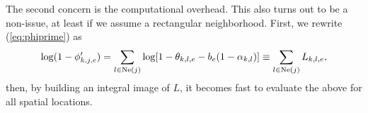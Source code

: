 \documentclass{article}
\begin{document}
The second concern is the computational overhead. This also turns out to be a non-issue, at least if we assume a rectangular neighborhood. First, we rewrite (\ref{eq:phiprime}) as 
\[
    \log(1 - \phi'_{k,j,e}) = \sum_{l \in \text{Ne}(j)} \log [1 - \theta_{k,l,e} - b_e (1 - \alpha_{k,l})] \equiv \sum_{l \in \text{Ne}(j)} L_{k,l,e},
\]
then, by building an integral image of $L$, it becomes fast to evaluate the above for all spatial locations.







\end{document}
